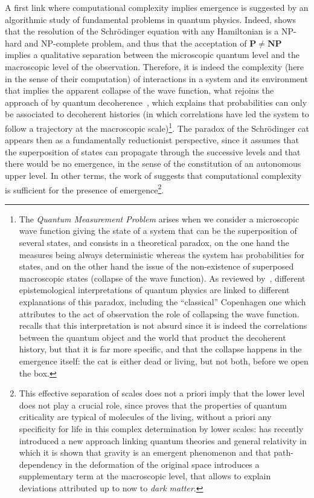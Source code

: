 A first link where computational complexity implies emergence is suggested by an algorithmic study of fundamental problems in quantum physics. Indeed, \cite{2014arXiv1403.7686B} shows that the resolution of the Schrödinger equation with any Hamiltonian is a NP-hard and NP-complete problem, and thus that the acceptation of $\mathbf{P}\neq\mathbf{NP}$ implies a qualitative separation between the microscopic quantum level and the macroscopic level of the observation. Therefore, it is indeed the complexity (here in the sense of their computation) of interactions in a system and its environment that implies the apparent collapse of the wave function, what rejoins the approach of  by quantum decoherence~\cite{gell1996quantum}, which explains that probabilities can only be associated to decoherent histories (in which correlations have led the system to follow a trajectory at the macroscopic scale)\footnote{The \emph{Quantum Measurement Problem} arises when we consider a microscopic wave function giving the state of a system that can be the superposition of several states, and consists in a theoretical paradox, on the one hand the measures being always deterministic whereas the system has probabilities for states, and on the other hand the issue of the non-existence of superposed macroscopic states (collapse of the wave function). As reviewed by~\cite{schlosshauer2005decoherence}, different epistemological interpretations of quantum physics are linked to different explanations of this paradox, including the ``classical'' Copenhagen one which attributes to the act of observation the role of collapsing the wave function.  recalls that this interpretation is not absurd since it is indeed the correlations between the quantum object and the world that product the decoherent history, but that it is far more specific, and that the collapse happens in the emergence itself: the cat is either dead or living, but not both, before we open the box.}. The paradox of the Schrödinger cat appears then as a fundamentally reductionist perspective, since it assumes that the superposition of states can propagate through the successive levels and that there would be no emergence, in the sense of the constitution of an autonomous upper level. In other terms, the work of \cite{2014arXiv1403.7686B} suggests that computational complexity is sufficient for the presence of emergence\footnote{This effective separation of scales does not a priori imply that the lower level does not play a crucial role, since \cite{vattay2015quantum} proves that the properties of quantum criticality are typical of molecules of the living, without a priori any specificity for life in this complex determination by lower scales: \cite{2016arXiv161102269V} has recently introduced a new approach linking quantum theories and general relativity in which it is shown that gravity is an emergent phenomenon and that path-dependency in the deformation of the original space introduces a supplementary term at the macroscopic level, that allows to explain deviations attributed up to now to \emph{dark matter}.}.


